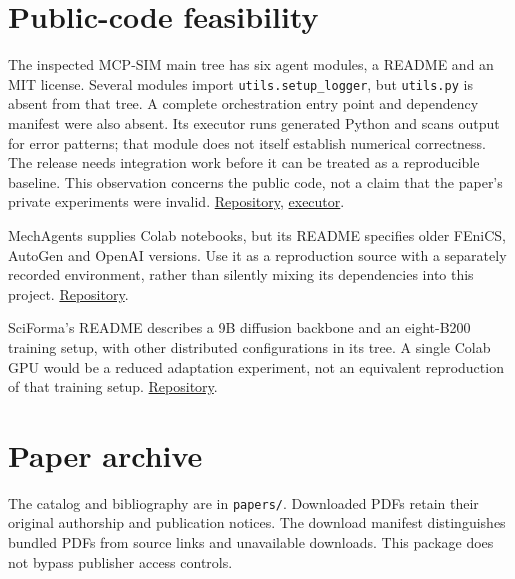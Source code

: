 \documentclass[
  11pt,
  a4paper,
]{article}
\begin{document}
\section{Public-code feasibility}\label{public-code-feasibility}

The inspected MCP-SIM main tree has six agent modules, a README and an
MIT license. Several modules import \texttt{utils.setup\_logger}, but
\texttt{utils.py} is absent from that tree. A complete orchestration
entry point and dependency manifest were also absent. Its executor runs
generated Python and scans output for error patterns; that module does
not itself establish numerical correctness. The release needs
integration work before it can be treated as a reproducible baseline.
This observation concerns the public code, not a claim that the paper's
private experiments were invalid.
\href{https://github.com/KAIST-M4/MCP-SIM}{Repository},
\href{https://github.com/KAIST-M4/MCP-SIM/blob/main/simulation_executor_agent.py}{executor}.

MechAgents supplies Colab notebooks, but its README specifies older
FEniCS, AutoGen and OpenAI versions. Use it as a reproduction source
with a separately recorded environment, rather than silently mixing its
dependencies into this project.
\href{https://github.com/lamm-mit/MechAgents}{Repository}.

SciForma's README describes a 9B diffusion backbone and an eight-B200
training setup, with other distributed configurations in its tree. A
single Colab GPU would be a reduced adaptation experiment, not an
equivalent reproduction of that training setup.
\href{https://github.com/microsoft/SciForma}{Repository}.

\section{Paper archive}\label{paper-archive}

The catalog and bibliography are in \texttt{papers/}. Downloaded PDFs
retain their original authorship and publication notices. The download
manifest distinguishes bundled PDFs from source links and unavailable
downloads. This package does not bypass publisher access controls.
\end{document}
